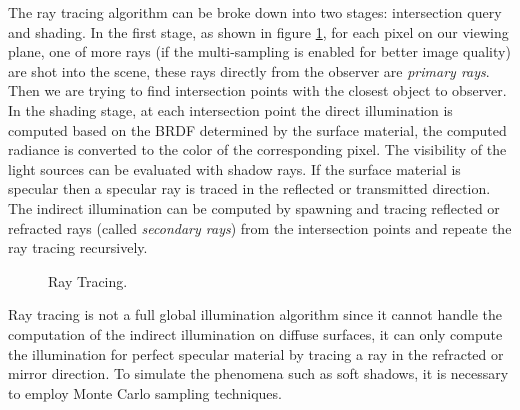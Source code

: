 The ray tracing algorithm can be broke down into two stages: intersection query and shading. In the first stage, as shown in figure \ref{fig:ray_tracing}, for each pixel on our viewing plane, one of more rays (if the multi-sampling is enabled for better image quality) are shot into the scene, these rays directly from the observer are \emph{primary rays}. Then we are trying to find intersection points with the closest object to observer. In the shading stage, at each intersection point the direct illumination is computed based on the BRDF determined by the surface material, the computed radiance is converted to the color of the corresponding pixel. The visibility of the light sources can be evaluated with shadow rays. If the surface material is specular then a specular ray is traced in the reflected or transmitted direction. The indirect illumination can be computed by spawning and tracing reflected or refracted rays (called \emph{secondary rays}) from the intersection points and repeate the ray tracing recursively. 

\begin{figure}[htp] 
    \centering 
    \renewcommand{\thefigure}{\thechapter.\arabic{figure}}
    \caption[]{Ray Tracing.}
    \label{fig:ray_tracing} 
\end{figure} 

Ray tracing is not a full global illumination algorithm since it cannot handle the computation of the indirect illumination on diffuse surfaces, it can only compute the illumination for perfect specular material by tracing a ray in the refracted or mirror direction. To simulate the phenomena such as soft shadows, it is necessary to employ Monte Carlo sampling techniques\cite{Kajiya:1986:RE:15922.15902}. 

